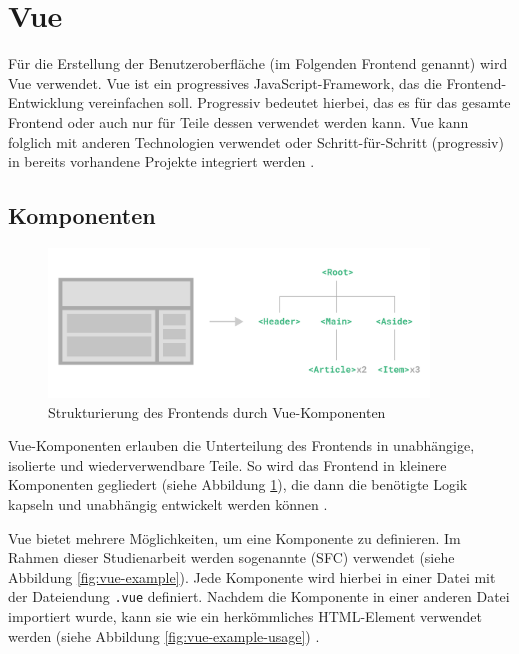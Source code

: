 %
%
\section{Vue}

Für die Erstellung der Benutzeroberfläche (im Folgenden \glqq Frontend\grqq{} genannt) wird Vue verwendet. Vue ist ein progressives JavaScript-Framework, das die Frontend-Entwicklung vereinfachen soll. Progressiv bedeutet hierbei, das es für das gesamte Frontend oder auch nur für Teile dessen verwendet werden kann. Vue kann folglich mit anderen Technologien verwendet oder Schritt-für-Schritt (progressiv) in bereits vorhandene Projekte integriert werden \cite[vgl.][]{VueIntroduction}.

\subsection{Komponenten}
\begin{figure}[H]
  \includegraphics[width=0.9\textwidth]{images/vue-components.png}
  \centering
  \caption[Vue-Komponenten]{Strukturierung des Frontends durch Vue-Komponenten \cite{VueComponentBasics}}
  \label{fig:vue-components}
\end{figure}

Vue-Komponenten erlauben die Unterteilung des Frontends in unabhängige, isolierte und wiederverwendbare Teile. So wird das Frontend in kleinere Komponenten gegliedert (siehe Abbildung \ref{fig:vue-components}), die dann die benötigte Logik kapseln und unabhängig entwickelt werden können \cite[vgl.][]{VueComponentBasics}.

Vue bietet mehrere Möglichkeiten, um eine Komponente zu definieren. Im Rahmen dieser Studienarbeit werden sogenannte  (\acs{SFC}) verwendet (siehe Abbildung \ref{fig:vue-example}). Jede Komponente wird hierbei in einer Datei mit der Dateiendung \lstinline{.vue} definiert. Nachdem die Komponente in einer anderen Datei importiert wurde, kann sie wie ein herkömmliches HTML-Element verwendet werden (siehe Abbildung \ref{fig:vue-example-usage}) \cite[vgl.][]{VueComponentBasics}.


